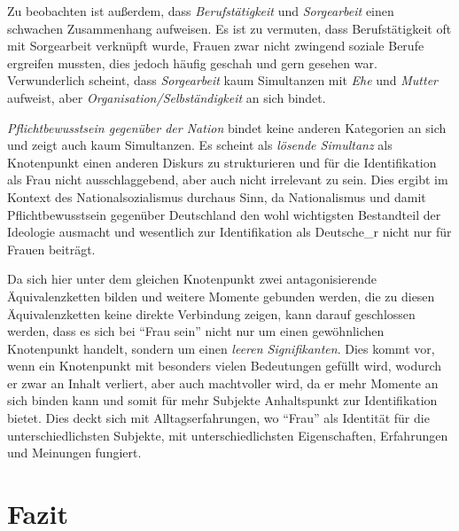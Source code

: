 \documentclass[12pt, titlepage=true, toc=bib]{scrartcl}
\begin{document}
Zu beobachten ist außerdem, dass \textit{Berufstätigkeit} und \textit{Sorgearbeit} einen schwachen Zusammenhang aufweisen. Es ist zu vermuten, dass Berufstätigkeit oft mit Sorgearbeit verknüpft wurde, Frauen zwar nicht zwingend soziale Berufe ergreifen mussten, dies jedoch häufig geschah und gern gesehen war. Verwunderlich scheint, dass \textit{Sorgearbeit} kaum Simultanzen mit \textit{Ehe} und \textit{Mutter} aufweist, aber \textit{Organisation/Selbständigkeit} an sich bindet. 

\textit{Pflichtbewusstsein gegenüber der Nation} bindet keine anderen Kategorien an sich und zeigt auch kaum Simultanzen. Es scheint als \textit{lösende Simultanz} als Knotenpunkt einen anderen Diskurs zu strukturieren und für die Identifikation als Frau nicht ausschlaggebend, aber auch nicht irrelevant zu sein. Dies ergibt im Kontext des Nationalsozialismus durchaus Sinn, da Nationalismus und damit Pflichtbewusstsein gegenüber Deutschland den wohl wichtigsten Bestandteil der Ideologie ausmacht und wesentlich zur Identifikation als Deutsche\_r nicht nur für Frauen beiträgt.


Da sich hier unter dem gleichen Knotenpunkt zwei antagonisierende Äquivalenzketten bilden und weitere Momente gebunden werden, die zu diesen Äquivalenzketten keine direkte Verbindung zeigen, kann darauf geschlossen werden, dass es sich bei "`Frau sein"' nicht nur um einen gewöhnlichen Knotenpunkt handelt, sondern um einen \textit{leeren Signifikanten}. Dies kommt vor, wenn ein Knotenpunkt mit besonders vielen Bedeutungen gefüllt wird, wodurch er zwar an Inhalt verliert, aber auch machtvoller wird, da er mehr Momente an sich binden kann und somit für mehr Subjekte Anhaltspunkt zur Identifikation bietet. Dies deckt sich mit Alltagserfahrungen, wo "`Frau"' als Identität für die unterschiedlichsten Subjekte, mit unterschiedlichsten Eigenschaften, Erfahrungen und Meinungen fungiert.


\section{Fazit}



\newpage

\nocite{medici_faschistische_1941}
\nocite{a._v._s._kameradschaft_1936}
\nocite{maltzahn_deutsche_1936}
\nocite{reimer_glucklich_1941}
\nocite{scholtz-klink_frauen_1936}
\nocite{weinhandl_wie_1941}
\nocite{friewart_japanisches_1941}
\end{document}

